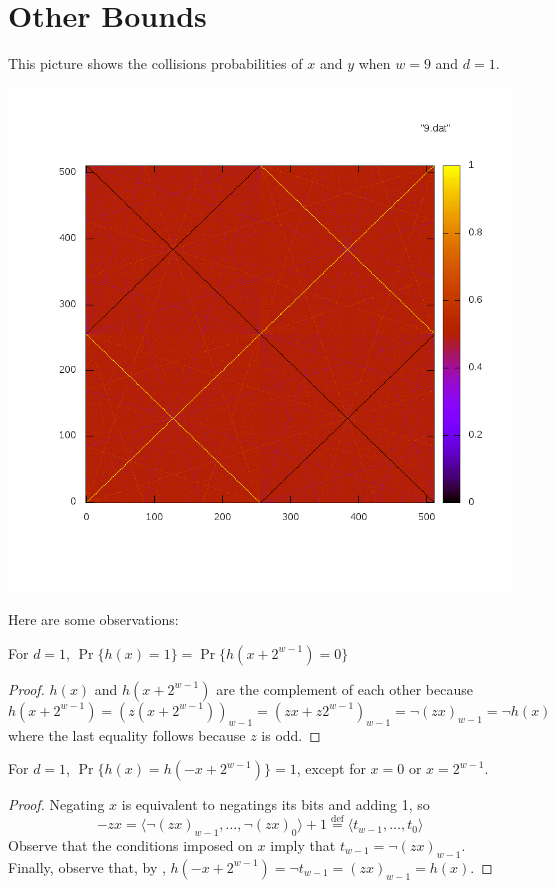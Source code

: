 \documentclass{patmorin}
\begin{document}
\section{Other Bounds}

This picture shows the collisions probabilities of $x$ and $y$ when $w=9$
and $d=1$.

\noindent \includegraphics[width=\textwidth]{9}

Here are some observations:

\begin{clm}
For $d=1$, $\Pr\{h(x)=1\} = \Pr\{h(x+2^{w-1})=0\}$
\end{clm}

\begin{proof}
$h(x)$ and $h(x+2^{w-1})$ are the complement of each other because
\[ h(x+2^{w-1}) = (z(x+2^{w-1}))_{w-1} = (zx + z2^{w-1})_{w-1} = \neg(zx)_{w-1} = \neg h(x)
\]
where the last equality follows because $z$ is odd.
\end{proof}

\begin{clm}
For $d=1$, $\Pr\{h(x) = h(-x + 2^{w-1})\} = 1$, except for $x=0$
or $x=2^{w-1}$.
\end{clm}

\begin{proof}
Negating $x$ is equivalent to negatings its bits and adding 1, so
\[
   -zx = \langle\neg{(zx)_{w-1}},\ldots,\neg{(zx)_{0}}\rangle + 1 
        \stackrel{\mathrm{def}}{=} \langle t_{w-1},\ldots,t_0\rangle
\]
Observe that the conditions imposed on $x$ imply that $t_{w-1}=\neg{(zx)_{w-1}}$.  Finally, observe that, by , $h(-x+2^{w-1})=\neg{t_{w-1}}=(zx)_{w-1}= h(x)$.
\end{proof}
\end{document}
